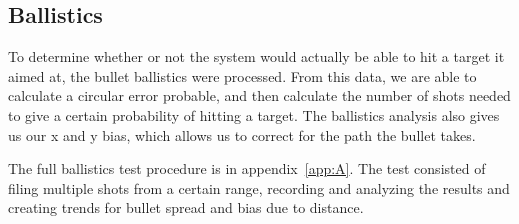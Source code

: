 ﻿\subsection{Ballistics}
To determine whether or not the system would actually be able to hit a target it aimed at, the bullet ballistics were processed. From this data, we are able to calculate a circular error probable, and then calculate the number of shots needed to give a certain probability of hitting a target. The ballistics analysis also gives us our x and y bias, which allows us to correct for the path the bullet takes.

The full ballistics test procedure is in appendix~\ref{app:A}. The test consisted of filing multiple shots from a certain range, recording and analyzing the results and creating trends for bullet spread and bias due to distance.

